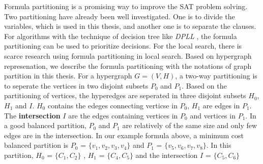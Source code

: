 \documentclass[12pt,a4paper,twoside]{scrartcl}
\numberwithin{equation}{section}
\begin{document}
Formula partitioning is a promising way to improve the SAT problem solving. Two partitioning have already been well investigated. One is to divide the variables, which is used in this thesis, and another one is to separate the clauses. For algorithms with the technique of decision tree like \emph{DPLL} \cite{nieuwenhuis2005abstract}, the formula partitioning can be used to prioritize decisions. For the local search, there is scarce research using formula partitioning in local search. Based on hypergraph represenation, we describe the formula partitioning with the notations of graph partition in this thesis. For a hypergraph $G = (V,H)$,  a two-way partitioning is to seperate the vertices in two disjoint subsets $P_0$ and $P_1$.  Based on the partitioning of vertices, the hyperedges are seperated in three disjoint subsets $H_0$, $H_1$ and $I$. $H_0$ contains the edeges connecting verticse in $P_0$, $H_1$ are edges in $P_1$. The \textbf{intersection} $I$ are the edges containing vertices in $P_0$ and vertices in $P_1$. In a good balanced partition, $P_0$ and $P_1$ are relatively of the same size and only few edges are in the intersection. In our example formula above, a minimum cost balanced partition is $P_0$ = $\{v_1,v_2, v_3, v_4\}$ and $P_1$ = $\{v_5,v_6, v_7, v_8\}$. In this partition, $H_0$ = $\{C_1,C_2\}$ , $H_1$ = $\{C_4,C_5\}$ and the intersection $I$ = $\{C_5,C_6\}$ 
\end{document}
